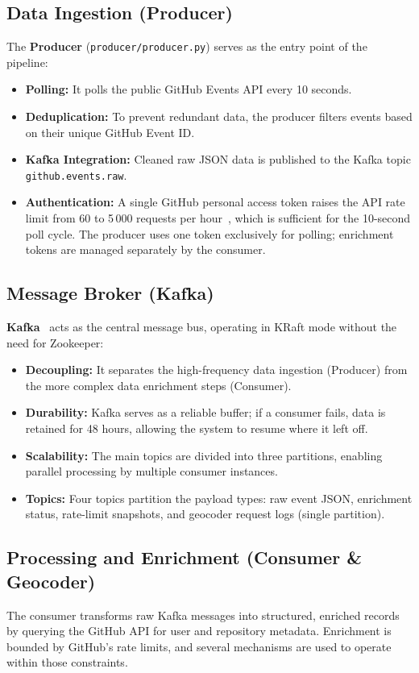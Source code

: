 \documentclass[sigconf]{acmart}
\begin{document}
\subsection{Data Ingestion (Producer)}
The \textbf{Producer} (\texttt{producer/producer.py}) serves as the entry point of the pipeline:
\begin{itemize}
    \item \textbf{Polling:} It polls the public GitHub Events API every 10 seconds.
    \item \textbf{Deduplication:} To prevent redundant data, the producer filters events based on their unique GitHub Event ID.
    \item \textbf{Kafka Integration:} Cleaned raw JSON data is published to the Kafka topic \texttt{github.events.raw}.
    \item \textbf{Authentication:} A single GitHub personal access token raises the API rate limit from 60 to 5\,000 requests per hour~\cite{github-rest-api}, which is sufficient for the 10-second poll cycle. The producer uses one token exclusively for polling; enrichment tokens are managed separately by the consumer.
\end{itemize}
\newpage
\subsection{Message Broker (Kafka)}
\textbf{Kafka}~\cite{kafka} acts as the central message bus, operating in KRaft mode without the need for Zookeeper:
\begin{itemize}
    \item \textbf{Decoupling:} It separates the high-frequency data ingestion (Producer) from the more complex data enrichment steps (Consumer).
    \item \textbf{Durability:} Kafka serves as a reliable buffer; if a consumer fails, data is retained for 48 hours, allowing the system to resume where it left off.
    \item \textbf{Scalability:} The main topics are divided into three partitions, enabling parallel processing by multiple consumer instances.
    \item \textbf{Topics:} Four topics partition the payload types: raw event JSON, enrichment status, rate-limit snapshots, and geocoder request logs (single partition).
\end{itemize}

\subsection{Processing and Enrichment (Consumer \& Geocoder)}
The consumer transforms raw Kafka messages into structured, enriched records by querying the GitHub API for user and repository metadata. Enrichment is bounded by GitHub's rate limits, and several mechanisms are used to operate within those constraints.
\end{document}
